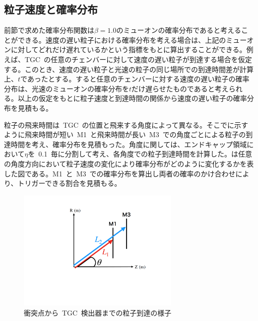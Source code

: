 \subsection{粒子速度と確率分布}\label{sec:prob}
前節で求めた確率分布関数は$\beta=1.0$のミューオンの確率分布であると考えることができる。速度の遅い粒子における確率分布を考える場合は、上記のミューオンに対してどれだけ遅れているかという指標をもとに算出することができる。例えば、TGC~の任意のチェンバーに対して速度の遅い粒子が到達する場合を仮定する。このとき、速度の遅い粒子と光速の粒子の同じ場所での到達時間差が計算上、$t$であったとする。すると任意のチェンバーに対する速度の遅い粒子の確率分布は、光速のミューオンの確率分布を$t$だけ遅らせたものであると考えられる。以上の仮定をもとに粒子速度と到達時間の関係から速度の遅い粒子の確率分布を見積もる。

粒子の飛来時間は~TGC~の位置と飛来する角度によって異なる。そこでに示すように飛来時間が短い~M1~と飛来時間が長い~M3~での角度ごとによる粒子の到達時間を考え、確率分布を見積もった。角度に関しては、エンドキャップ領域において$\eta$を~0.1~毎に分割して考え、各角度での粒子到達時間を計算した。は任意の角度方向において粒子速度の変化により確率分布がどのように変化するかを表した図である。M1~と~M3~での確率分布を算出し両者の確率のかけ合わせにより、トリガーできる割合を見積もる。
\begin{figure}[tbp]
    \centering   
    \includegraphics[width=0.7\textwidth,page=1]{img/slide/BX.pdf}
    \caption{衝突点から~TGC~検出器までの粒子到達の様子}\label{fig:velo}
\end{figure}

